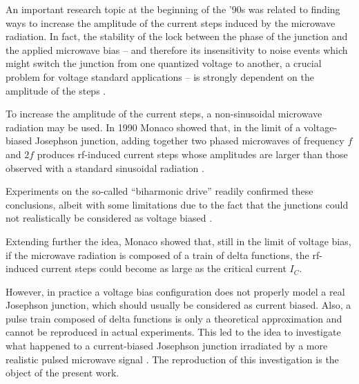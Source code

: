 
An important research topic at the beginning of the '90s was related to finding ways to increase the amplitude of the current steps induced by the microwave radiation. In fact, the stability of the lock between the phase of the junction and the applied microwave bias -- and therefore its insensitivity to noise events which might switch the junction from one quantized voltage to another, a crucial problem for voltage standard applications -- is strongly dependent on the amplitude of the steps \cite{Kautz:1987}.

To increase the amplitude of the current steps, a non-sinusoidal microwave radiation may be used.
In 1990 Monaco showed that, in the limit of a voltage-biased Josephson junction, adding together two phased microwaves of frequency $f$ and $2 f$ produces rf-induced current steps whose amplitudes are larger than those observed with a standard sinusoidal radiation \cite{Monaco:1990}.

Experiments on the so-called ``biharmonic drive'' readily confirmed these conclusions, albeit with some limitations due to the fact that the junctions could not realistically be considered as voltage biased \cite{Andreone:1991, Andreone:1992}.


Extending further the idea, Monaco showed that, still in the limit of voltage bias, if the microwave radiation is composed of a train of delta functions, the rf-induced current steps could become as large as the critical current $I_C$.

However, in practice a voltage bias configuration does not properly model a real Josephson junction, which  should usually be considered as current biased.
Also, a pulse train composed of delta functions is only a theoretical approximation and cannot be reproduced in actual experiments.
This led to the idea to investigate what happened to a current-biased Josephson junction irradiated by a more realistic pulsed microwave signal \cite{Maggi:1996, Maggi:1997}. 
The reproduction of this investigation is the object of the present work.



